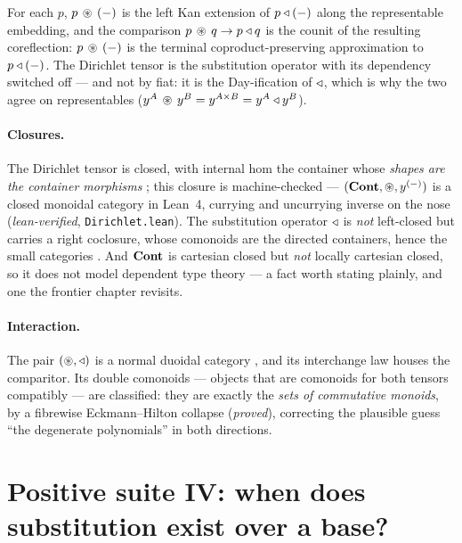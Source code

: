 \begin{theorem}\label{thm:cob-comparitor}
For each $p$, $p\,\circledast\,(-)$ is the left Kan extension of $p\triangleleft(-)$ along the
representable embedding, and the comparison $p\,\circledast\,q\to p\triangleleft q$ is the counit
of the resulting coreflection: $p\,\circledast\,(-)$ is the terminal
coproduct-preserving approximation to $p\triangleleft(-)$. The Dirichlet tensor is the
substitution operator with its dependency switched off --- and not by fiat: it is
the Day-ification of $\triangleleft$, which is why the two agree on representables
($y^{A}\,\circledast\,y^{B}=y^{A\times B}=y^{A}\triangleleft y^{B}$).
\end{theorem}

\paragraph{Closures.} The Dirichlet tensor is closed, with internal hom the
container whose \emph{shapes are the container morphisms} \cite{NiuSpivak}; this
closure is machine-checked --- $(\mathbf{Cont},\circledast,y^{(-)})$ is a closed monoidal category in
Lean~4, currying and uncurrying inverse on the nose (\emph{lean-verified},
\texttt{Dirichlet.lean}). The substitution operator $\triangleleft$ is \emph{not}
left-closed but carries a right coclosure, whose comonoids are the directed
containers, hence the small categories \cite{AU16}. And $\mathbf{Cont}$ is
cartesian closed but \emph{not} locally cartesian closed, so it does not model
dependent type theory --- a fact worth stating plainly, and one the frontier
chapter revisits.

\paragraph{Interaction.} The pair $(\circledast,\triangleleft)$ is a normal duoidal category
\cite{SpivakSrinivasan}, and its interchange law houses the comparitor. Its double
comonoids --- objects that are comonoids for both tensors compatibly --- are
classified: they are exactly the \emph{sets of commutative monoids}, by a
fibrewise Eckmann--Hilton collapse (\emph{proved}), correcting the plausible guess
``the degenerate polynomials'' in both directions.

\section{Positive suite IV: when does substitution exist over a base?}
\label{sec:cob-admiss}


